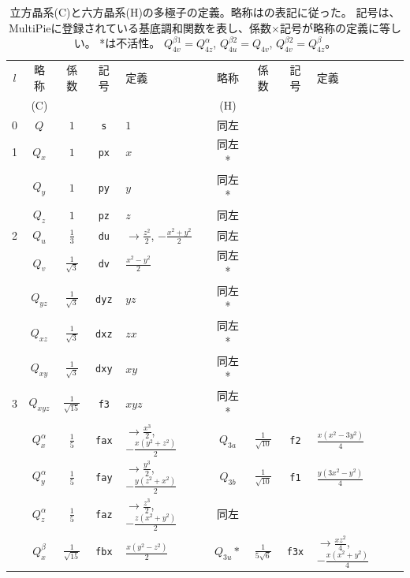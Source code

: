 \documentclass[11pt]{easymemo}
\begin{document}
\begin{table}[ht!]
\begin{center}
\caption{立方晶系(C)と六方晶系(H)の多極子の定義。略称は\cite{Hayami18,Yatsushiro22}の表記に従った。
記号は、MultiPieに登録されている基底調和関数を表し、係数$\times$記号が略称の定義に等しい。
*は不活性。
$Q_{4v}^{\beta1}=Q_{4z}^\alpha$, $Q_{4u}^{\beta2}=Q_{4v}$, $Q_{4v}^{\beta2}=Q_{4z}^\beta$。
\label{tbl:muldef}}
\renewcommand{\arraystretch}{1.3}
\scriptsize
\begin{tabular}{c||c|c|c|l||c|c|c|l} \hline \hline
$l$ & 略称 & 係数 & 記号 & 定義 & 略称 & 係数 & 記号 & 定義 \\
& (C) & & & & (H) & & & \\ \hline
0 & $Q$ & $1$ & \texttt{s} & $ 1 $ & 同左 & & & \\
\hline
1 & $Q_x$ & $1$ & \texttt{px} & $ x $ & 同左* & & & \\
  & $Q_y$ & $1$ & \texttt{py} & $ y $ & 同左* & & & \\
  & $Q_z$ & $1$ & \texttt{pz} & $ z $ & 同左 & & & \\
\hline
2 & $Q_u$ & $\frac{1}{3}$ & \texttt{du} & $\to\frac{z^2}{2}$, $-\frac{x^2+y^2}{2}$ & 同左 & & & \\
  & $Q_v$ & $\frac{1}{\sqrt{3}}$ & \texttt{dv} & $ \frac{x^2 - y^2}{2} $ & 同左* & & & \\
  & $Q_{yz}$ & $\frac{1}{\sqrt{3}}$ & \texttt{dyz} & $ y z $ & 同左* & & & \\
  & $Q_{xz}$ & $\frac{1}{\sqrt{3}}$ & \texttt{dxz} & $ z x $ & 同左* & & & \\
  & $Q_{xy}$ & $\frac{1}{\sqrt{3}}$ & \texttt{dxy} & $ x y $ & 同左* & & & \\
 \hline
3 & $Q_{xyz}$ & $\frac{1}{\sqrt{15}}$ & \texttt{f3} & $ x y z $ & 同左* & & & \\
  & $Q_x^\alpha$ & $\frac{1}{5}$ & \texttt{fax} & $\to\frac{x^3}{2}$, $-\frac{x(y^2+z^2)}{2}$ &
$Q_{3a}$ & $\frac{1}{\sqrt{10}}$ & \texttt{f2} & $ \frac{x(x^{2}-3y^{2})}{4}$ \\
  & $Q_y^\alpha$ & $\frac{1}{5}$ & \texttt{fay} & $\to\frac{y^3}{2}$, $-\frac{y(z^2+x^2)}{2}$ &
$Q_{3b}$ & $\frac{1}{\sqrt{10}}$ & \texttt{f1} & $ \frac{y(3x^{2}-y^{2})}{4}$ \\
  & $Q_z^\alpha$ & $\frac{1}{5}$ & \texttt{faz} & $\to\frac{z^3}{2}$, $-\frac{z(x^2+y^2)}{2}$ & 同左 & & & \\
  & $Q_x^\beta$ & $\frac{1}{\sqrt{15}}$ & \texttt{fbx} & $ \frac{x(y^2-z^2)}{2}$ &
$Q_{3u}*$ & $\frac{1}{5\sqrt{6}}$ & \texttt{f3x} & $\to\frac{xz^2}{4}$, $-\frac{x(x^2+y^2)}{4}$ \\

\end{tabular}
\end{center}
\end{table}
\end{document}
